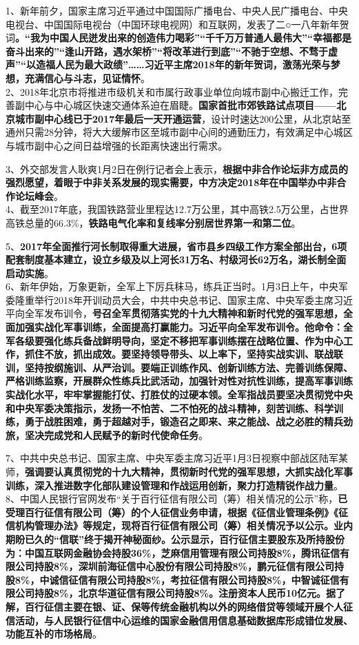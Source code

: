 1、新年前夕，国家主席习近平通过中国国际广播电台、中央人民广播电台、中央电视台、中国国际电视台（中国环球电视网）和互联网，发表了二○一八年新年贺词{\textbf{。``我为中国人民迸发出来的创造伟力喝彩''``千千万万普通人最伟大''``幸福都是奋斗出来的''``逢山开路，遇水架桥''``将改革进行到底''``不驰于空想、不骛于虚声''``以造福人民为最大政绩''\ldots{}\ldots{}习近平主席2018年的新年贺词，激荡光荣与梦想，充满信心与斗志，见证情怀}}。\\
2、2018年北京市将推进市级机关和市属行政事业单位向城市副中心搬迁工作，完善副中心与中心城区快速交通体系迫在眉睫。{\textbf{国家首批市郊铁路试点项目------北京城市副中心线已于2017年最后一天开通运营}}，设计时速达200公里，从北京站至通州只需28分钟，将大大缓解市区至城市副中心间的通勤压力，有效满足中心城区与城市副中心之间日益增强的长距离快速出行需求。

3、外交部发言人耿爽1月2日在例行记者会上表示，{\textbf{根据中非合作论坛非方成员的强烈愿望，着眼于中非关系发展的现实需要，中方决定2018年在中国举办中非合作论坛峰会}}。\\
4、截至2017年底，我国铁路营业里程达12.7万公里，其中高铁2.5万公里，占世界高铁总量的66.3\%，{\textbf{铁路电气化率和复线率分别居世界第一和第二位}}。

5、{\textbf{2017年全面推行河长制取得重大进展，省市县乡四级工作方案全部出台，6项配套制度基本建立，设立乡级及以上河长31万名、村级河长62万名，湖长制全面启动实施}}。\\
6、新年伊始，万象更新，全军上下厉兵秣马，练兵正当时。1月3日上午，中央军委隆重举行2018年开训动员大会，中共中央总书记、国家主席、中央军委主席习近平向全军发布训令，{\textbf{号召全军贯彻落实党的十九大精神和新时代党的强军思想，全面加强实战化军事训练，全面提高打赢能力。习近平向全军发布训令。他命令：全军各级要强化练兵备战鲜明导向，坚定不移把军事训练摆在战略位置、作为中心工作，抓住不放，抓出成效。要坚持领导带头、以上率下，坚持实战实训、联战联训，坚持按纲施训、从严治训。要端正训练作风、创新训练方法、完善训练保障、严格训练监察，开展群众性练兵比武活动，加强针对性对抗性训练，提高军事训练实战化水平，牢牢掌握能打仗、打胜仗的过硬本领。全军指战员要坚决贯彻党中央和中央军委决策指示，发扬一不怕苦、二不怕死的战斗精神，刻苦训练、科学训练，勇于战胜困难，勇于超越对手，锻造召之即来、来之能战、战之必胜的精兵劲旅，坚决完成党和人民赋予的新时代使命任务}}。

7、中共中央总书记、国家主席、中央军委主席习近平1月3日视察中部战区陆军某师，{\textbf{强调要认真贯彻党的十九大精神，贯彻新时代党的强军思想，大抓实战化军事训练，深入推进数字化部队建设管理和作战运用创新，聚力打造精锐作战力量}}。\\
8、中国人民银行官网发布``关于百行征信有限公司（筹）相关情况的公示''称，{\textbf{已受理百行征信有限公司（筹）的个人征信业务申请，根据《征信业管理条例》《征信机构管理办法》等规定，现将百行征信有限公司（筹）相关情况予以公示。业内期盼已久的``信联''终于揭开神秘面纱。公示显示，百行征信主要股东及所持股份为：中国互联网金融协会持股36\%，芝麻信用管理有限公司持股8\%，腾讯征信有限公司持股8\%，深圳前海征信中心股份有限公司持股8\%，鹏元征信有限公司持股8\%，中诚信征信有限公司持股8\%，考拉征信有限公司持股8\%，中智诚征信有限公司持股8\%，北京华道征信有限公司持股8\%。注册资本人民币10亿元。据了解，百行征信主要在银、证、保等传统金融机构以外的网络借贷等领域开展个人征信活动，与人民银行征信中心运维的国家金融信用信息基础数据库形成错位发展、功能互补的市场格局}}。

